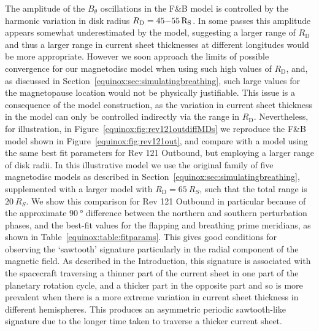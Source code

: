 The amplitude of the $B_{\theta}$ oscillations in the F{\&}B model is controlled by the harmonic variation in disk radius $R_\mathrm{D}=45{\--}\SI{55}{R_S}$. In some passes this amplitude appears somewhat underestimated by the model, suggesting a larger range of $R_\mathrm{D}$ and thus a larger range in current sheet thicknesses at different longitudes would be more appropriate. However we soon approach the limits of possible convergence for our magnetodisc model when using such high values of $R_\mathrm{D}$, and, as discussed in Section~\ref{equinox:sec:simulatingbreathing}, such large values for the magnetopause location would not be physically justifiable. This issue is a consequence of the model construction, as the variation in current sheet thickness in the model can only be controlled indirectly via the range in $R_\mathrm{D}$. Nevertheless, for illustration, in Figure~\ref{equinox:fig:rev121outdiffMDs} we reproduce the F{\&}B model shown in Figure~\ref{equinox:fig:rev121out}, and compare with a model using the same best fit parameters for Rev 121 Outbound, but employing a larger range of disk radii. In this illustrative model we use the original family of five magnetodisc models as described in Section~\ref{equinox:sec:simulatingbreathing}, supplemented with a larger model with $R_\mathrm{D}=\SI{65}{R_S}$, such that the total range is $\SI{20}{R_S}$. We show this comparison for Rev 121 Outbound in particular because of the approximate $\SI{90}{\degree}$ difference between the northern and southern perturbation phases, and the best-fit values for the flapping and breathing prime meridians, as shown in Table~\ref{equinox:table:fitparams}. This gives good conditions for observing the `sawtooth' signature particularly in the radial component of the magnetic field. As described in the Introduction, this signature is associated with the spacecraft traversing a thinner part of the current sheet in one part of the planetary rotation cycle, and a thicker part in the opposite part \citep{cowley2017a} and so is more prevalent when there is a more extreme variation in current sheet thickness in different hemispheres. This produces an asymmetric periodic sawtooth-like signature due to the longer time taken to traverse a thicker current sheet. 

